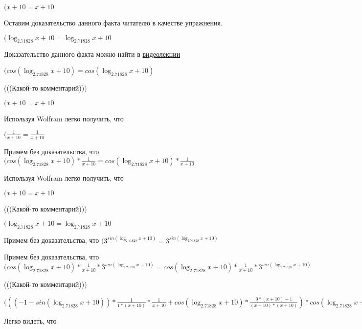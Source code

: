 \documentclass[12pt,a4paper,fleqn]{article}
\theoremstyle{definition}
\begin{document}
$( x  +  10  =  x  +  10 $

Оставим доказательство данного факта читателю в качестве упражнения.

$(\log_{ 2.71828 }{ x  +  10 } = \log_{ 2.71828 }{ x  +  10 }$

Доказательство данного факта можно найти в \href{https://www.youtube.com/watch?v=dQw4w9WgXcQ}{видеолекции}

$(cos(\log_{ 2.71828 }{ x  +  10 }) = cos(\log_{ 2.71828 }{ x  +  10 })$

(((Какой-то комментарий)))

$( x  +  10  =  x  +  10 $

Используя Wolfram легко получить, что

$(\frac{ 1 }{ x  +  10 }
 = \frac{ 1 }{ x  +  10 }
$

Примем без доказательства, что
$(cos(\log_{ 2.71828 }{ x  +  10 }) * \frac{ 1 }{ x  +  10 }
 = cos(\log_{ 2.71828 }{ x  +  10 }) * \frac{ 1 }{ x  +  10 }
$

Используя Wolfram легко получить, что

$( x  +  10  =  x  +  10 $

(((Какой-то комментарий)))

$(\log_{ 2.71828 }{ x  +  10 } = \log_{ 2.71828 }{ x  +  10 }$

Примем без доказательства, что
$({ 3 }^{sin(\log_{ 2.71828 }{ x  +  10 })} = { 3 }^{sin(\log_{ 2.71828 }{ x  +  10 })}$

Примем без доказательства, что
$(cos(\log_{ 2.71828 }{ x  +  10 }) * \frac{ 1 }{ x  +  10 }
 * { 3 }^{sin(\log_{ 2.71828 }{ x  +  10 })} = cos(\log_{ 2.71828 }{ x  +  10 }) * \frac{ 1 }{ x  +  10 }
 * { 3 }^{sin(\log_{ 2.71828 }{ x  +  10 })}$

(((Какой-то комментарий)))

$((( -1  - sin(\log_{ 2.71828 }{ x  +  10 })) * \frac{ 1 }{ 1  * ( x  +  10 )}
 * \frac{ 1 }{ x  +  10 }
 + cos(\log_{ 2.71828 }{ x  +  10 }) * \frac{ 0  * ( x  +  10 ) -  1 }{( x  +  10 ) * ( x  +  10 )}
) * cos(\log_{ 2.71828 }{ x  +  10 }) * \frac{ 1 }{ x  +  10 }
 * { 3 }^{sin(\log_{ 2.71828 }{ x  +  10 })} = (( -1  - sin(\log_{ 2.71828 }{ x  +  10 })) * \frac{ 1 }{ 1  * ( x  +  10 )}
 * \frac{ 1 }{ x  +  10 }
 + cos(\log_{ 2.71828 }{ x  +  10 }) * \frac{ 0  * ( x  +  10 ) -  1 }{( x  +  10 ) * ( x  +  10 )}
) * cos(\log_{ 2.71828 }{ x  +  10 }) * \frac{ 1 }{ x  +  10 }
 * { 3 }^{sin(\log_{ 2.71828 }{ x  +  10 })}$

Легко видеть, что
\end{document}
